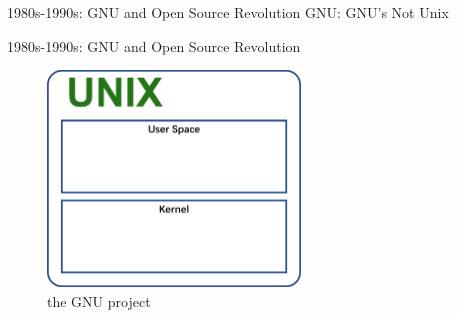 \documentclass{beamer}
\begin{document}
\begin{frame}[t]{1980s-1990s: GNU and Open Source Revolution}
    \vspace{7em}
    \centering
    \Huge
    GNU: GNU's Not Unix
\end{frame}

\begin{frame}[t]{1980s-1990s: GNU and Open Source Revolution}
    \begin{figure}
        \includegraphics[width=0.6\textwidth]{images/gnu1.png}
        \caption{the GNU project}
    \end{figure}
\end{frame}
\end{document}
